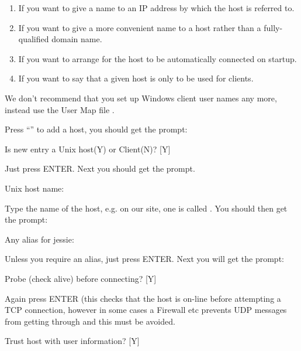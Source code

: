 \begin{enumerate}
\item If you want to give a name to an IP address by which the host is referred to.
\item If you want to give a more convenient name to a host rather than a fully-qualified domain name.
\item If you want to arrange for the host to be automatically connected on startup.
\item If you want to say that a given host is only to be used for clients.
\end{enumerate}
We don't recommend that you set up Windows client user names any more, instead use the User Map file \usermap.

Press ``'' to add a host, you should get the prompt:

\begin{expara}

Is new entry a Unix host(Y) or Client(N)? [Y]

\end{expara}

Just press ENTER. Next you should get the prompt.

\begin{expara}

Unix host name:

\end{expara}

Type the name of the host, e.g. on our site, one is called . You should then
get the prompt:

\begin{expara}

Any alias for jessie:

\end{expara}

Unless you require an alias, just press ENTER. Next you will get the prompt:

\begin{expara}

Probe (check alive) before connecting? [Y]

\end{expara}

Again press ENTER (this checks that the host is on-line before
attempting a TCP connection, however in some cases a Firewall etc
prevents UDP messages from getting through and this must be avoided.

\begin{expara}

Trust host with user information? [Y]

\end{expara}

